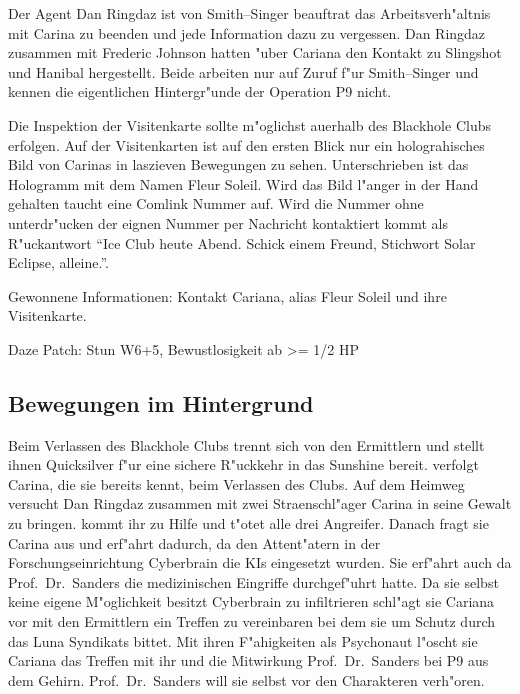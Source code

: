 Der Agent {\emph{}Dan Ringdaz} ist von Smith--Singer beauftrat das Arbeitsverh"altnis mit Carina zu beenden und jede Information dazu zu vergessen. Dan Ringdaz zusammen mit Frederic Johnson hatten "uber Cariana den Kontakt zu Slingshot und Hanibal hergestellt. Beide arbeiten nur auf Zuruf f"ur Smith--Singer und kennen die eigentlichen Hintergr"unde der Operation P9 nicht.

Die Inspektion der Visitenkarte sollte m"oglichst au\3erhalb des Blackhole Clubs erfolgen. Auf der Visitenkarten ist auf den ersten Blick nur ein holograhisches Bild von Carinas in laszieven Bewegungen zu sehen. Unterschrieben ist das Hologramm mit dem Namen Fleur Soleil. Wird das Bild l"anger in der Hand gehalten taucht eine Comlink Nummer auf. Wird die Nummer ohne unterdr"ucken der eignen Nummer per Nachricht kontaktiert kommt als R"uckantwort "`Ice Club heute Abend. Schick einem Freund, Stichwort Solar Eclipse, alleine."'.

\begin{remarks}
	Gewonnene Informationen: Kontakt Cariana, alias Fleur Soleil und ihre Visitenkarte.

	Daze Patch: Stun W6+5, Bewustlosigkeit ab >= 1/2 HP
\end{remarks}


\subsection{Bewegungen im Hintergrund}

Beim Verlassen des Blackhole Clubs trennt sich \xl{} von den Ermittlern und stellt ihnen Quicksilver f"ur eine sichere R"uckkehr in das Sunshine bereit. \xl{} verfolgt Carina, die sie bereits kennt, beim Verlassen des Clubs. Auf dem Heimweg versucht Dan Ringdaz zusammen mit zwei Stra\3enschl"ager Carina in seine Gewalt zu bringen. \xl{} kommt ihr zu Hilfe und t"otet alle drei Angreifer. Danach fragt sie Carina aus und erf"ahrt dadurch, da\3 den Attent"atern in der Forschungseinrichtung Cyberbrain die KIs eingesetzt wurden. Sie erf"ahrt auch da\3 Prof.~Dr.~Sanders die medizinischen Eingriffe durchgef"uhrt hatte. Da sie selbst keine eigene M"oglichkeit besitzt Cyberbrain zu infiltrieren schl"agt sie Cariana vor mit den Ermittlern ein Treffen zu vereinbaren bei dem sie um Schutz durch das Luna Syndikats bittet. Mit ihren F"ahigkeiten als Psychonaut l"oscht sie Cariana das Treffen mit ihr und die Mitwirkung Prof.~Dr.~Sanders bei P9 aus dem Gehirn. Prof.~Dr.~Sanders will sie selbst vor den Charakteren verh"oren.


